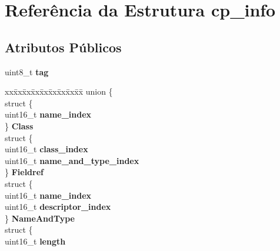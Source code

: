 \hypertarget{structcp__info}{\section{Referência da Estrutura cp\-\_\-info}
\label{structcp__info}
}
\subsection*{Atributos Públicos}
\begin{DoxyCompactItemize}
\item 
\hypertarget{structcp__info_a29d87595bc993eb6cd53f30e8305ec74}{uint8\-\_\-t {\bfseries tag}}\label{structcp__info_a29d87595bc993eb6cd53f30e8305ec74}

\item 
\hypertarget{structcp__info_ac2b02c93a1a6a6252c140c29865f4a56}{\begin{tabbing}
xx\=xx\=xx\=xx\=xx\=xx\=xx\=xx\=xx\=\kill
union \{\\
\hypertarget{unioncp__info_1_1@0_a7f0a8c80f9ee6c21d6dabf39b619ca2d}{\>struct \{\\
\hypertarget{structcp__info_1_1@0_1_1@1_a3c8912fe67e7d3f9ce150aa6f5bec22d}{\>\>uint16\_t {\bfseries name\_index}\\
\>\} {\bfseries Class}\\
\hypertarget{unioncp__info_1_1@0_ace4b0161d2312eed96c3c15d9f45dcca}{\>struct \{\\
\hypertarget{structcp__info_1_1@0_1_1@2_ab2b48e96f2178c47f9f6b683c9b2fc59}{\>\>uint16\_t {\bfseries class\_index}\\
\hypertarget{structcp__info_1_1@0_1_1@2_ad7a8733b3b078818a59cc33eb1fa7dc3}{\>\>uint16\_t {\bfseries name\_and\_type\_index}\\
\>\} {\bfseries Fieldref}\\
\hypertarget{unioncp__info_1_1@0_aa3c7cfd38a5aa9395fcac9d977e7eaa7}{\>struct \{\\
\hypertarget{structcp__info_1_1@0_1_1@3_a3c8912fe67e7d3f9ce150aa6f5bec22d}{\>\>uint16\_t {\bfseries name\_index}\\
\hypertarget{structcp__info_1_1@0_1_1@3_aef3c90a1a874ca4acbc49029aaa0d4cb}{\>\>uint16\_t {\bfseries descriptor\_index}\\
\>\} {\bfseries NameAndType}\\
\hypertarget{unioncp__info_1_1@0_ac063fa60e4a62912beda055fdf23480f}{\>struct \{\\
\hypertarget{structcp__info_1_1@0_1_1@4_afa18d3ff419ce300281ca759a20a2cc3}{\>\>uint16\_t {\bfseries length}\\
}}}}}}}}}}
\end{tabbing}}
\end{DoxyCompactItemize}
